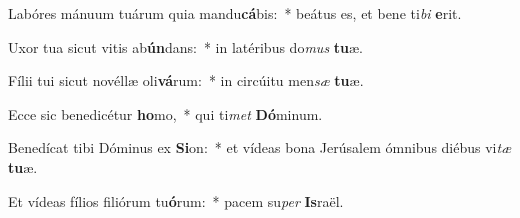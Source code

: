 \item Labóres mánuum tuárum quia mandu\textbf{cá}bis:~* beátus es, et bene ti\textit{bi} \textbf{e}rit.
\item Uxor tua sicut vitis ab\textbf{ún}dans:~* in latéribus do\textit{mus} \textbf{tu}æ.
\item Fílii tui sicut novéllæ oli\textbf{vá}rum:~* in circúitu men\textit{sæ} \textbf{tu}æ.
\item Ecce sic benedicétur \textbf{ho}mo,~* qui ti\textit{met} \textbf{Dó}minum.
\item Benedícat tibi Dóminus ex \textbf{Si}on:~* et vídeas bona Jerúsalem ómnibus diébus vi\textit{tæ} \textbf{tu}æ.
\item Et vídeas fílios filiórum tu\textbf{ó}rum:~* pacem su\textit{per} \textbf{Is}raël.
